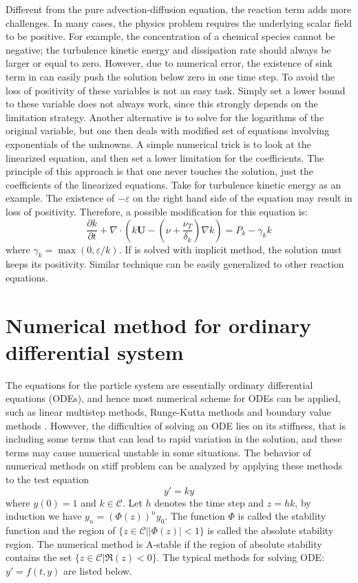 Different from the pure advection-diffusion equation, the reaction term adds more challenges. In many cases, the physics problem requires the underlying scalar field to be positive. For example, the concentration of a chemical species cannot be negative; the turbulence kinetic energy and dissipation rate should always be larger or equal to zero. However, due to numerical error, the existence of sink term in  can easily push the solution below zero in one time step. To avoid the loss of positivity of these variables is not an easy task. Simply set a lower bound to these variable does not always work, since this strongly depends on the limitation strategy. Another alternative is to solve for the logarithms of the original variable, but one then deals with modified set of equations involving exponentials of the unknowns. A simple numerical trick is to look at the linearized equation, and then set a lower limitation for the coefficients. The principle of this approach is that one never touches the solution, just the coefficients of the linearized equations. Take  for turbulence kinetic energy as an example. The existence of $-\varepsilon$ on the right hand side of the equation may result in loss of positivity. Therefore, a possible modification for this equation is:
\begin{equation}
\frac{\partial k}{\partial t}
+\nabla\cdot(k\mathbf{U}
-(\nu+\frac{\nu_T}{\delta_k})\nabla k) 
= P_k - \gamma_k k
\label{eq:k_eqn}
\end{equation}
where $\gamma_k = \max(0, \varepsilon/k)$. If  is solved with implicit method, the solution must keeps its positivity. Similar technique can be easily generalized to other reaction equations.

\section{Numerical method for ordinary differential system}
The equations for the particle system are essentially ordinary differential equations (ODEs), and hence most numerical scheme for ODEs can be applied, such as linear multistep methods, Runge-Kutta methods \cite{Butcher2003Numerical} and boundary value methods \cite{Brugnano1998Boundary}. However, the difficulties of solving an ODE lies on its stiffness, that is including some terms that can lead to rapid variation in the solution, and these terms may cause numerical unstable in some situations. The behavior of numerical methods on stiff problem can be analyzed by applying these methods to the test equation
\begin{equation}
y' = k y
\label{test_eqn}
\end{equation}   
where $y(0) = 1$ and $k \in \mathcal{C}$. Let $h$ denotes the time step and $z = hk$, by induction we have $y_n = (\Phi(z))^ny_0$. The function $\Phi$ is called the stability function and the region of $\{z\in \mathcal{C}| |\Phi(z)| < 1\}$ is called the absolute stability region. The numerical method is A-stable if the region of absolute stability contains the set $\{ z \in \mathcal{C}| \Re(z) < 0\}$. The typical methods for solving ODE: $y' = f(t,y)$ are listed below.

